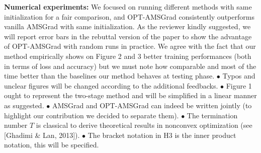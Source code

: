\documentclass{article}
\begin{document}
\textbf{Numerical experiments:}
We focused on running different methods with same initialization for a fair comparison, and OPT-AMSGrad consistently outperforms vanilla AMSGrad with same initialization. As the reviewer kindly suggested, we will report error bars in the rebuttal version of the paper to show the advantage of OPT-AMSGrad with random runs in practice.
We agree with the fact that our method empirically shows on Figure 2 and 3 better training performances (both in terms of loss and accuracy) but we must note how comparable and most of the time better than the baselines our method behaves at testing phase.
$\bullet$ Typos and unclear figures will be changed according to the additional feedbacks.
$\bullet$ Figure 1 ought to represent the two-stage method and will be simplified in a linear manner as suggested. $\bullet$ AMSGrad and OPT-AMSGrad can indeed be written jointly (to highlight our contribution we decided to separate them). $\bullet$ The termination number $T$ is classical to derive theoretical results in nonconvex optimization (see [Ghadimi \& Lan, 2013]). $\bullet$ The bracket notation in H3 is the inner product notation, this will be specified.
\end{document}
